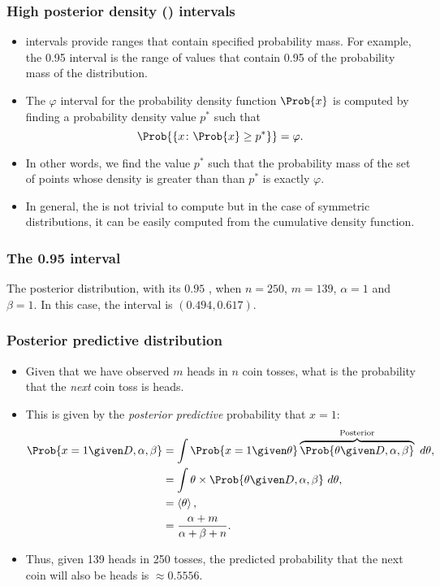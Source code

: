 \documentclass{slides}
\begin{document}
\begin{frame}
	\frametitle{High posterior density (\hpd) intervals}
	\begin{itemize}
		\item \hpd intervals provide ranges that contain specified probability mass. For example, the 0.95 \hpd interval is the range of values that contain 0.95 of the probability mass of the distribution.
		\item The $\varphi$ \hpd interval for the probability density function $\Prob{x}$ is computed by finding a probability density value $p^*$ such that 
		\[
			\Prob{\{x \colon \Prob{x} \geq p^*\}} = \varphi.
		\]
		\item In other words, we find the value $p^*$ such that the probability mass of the set of points whose density is greater than than $p^*$ is exactly $\varphi$. 
		\item In general, the \hpd is not trivial to compute but in the case of symmetric distributions, it can be easily computed from the cumulative density function.
	\end{itemize}
\end{frame}

\begin{frame}
	\frametitle{The 0.95 \hpd interval}
	
	The posterior distribution, with its $0.95$ \hpd, when $n=250$, $m=139$, $\alpha=1$ and $\beta=1$. In this case, the \hpd interval is $(0.494, 0.617)$.
\end{frame}

\begin{frame}
	\frametitle{Posterior predictive distribution}

	\begin{itemize}
		\item Given that we have observed $m$ heads in $n$ coin tosses, what is the probability that the \emph{next} coin toss is heads.
		\item This is given by the \emph{posterior predictive} probability that $x=1$:
			\begin{align*}
				\Prob{x=1\given D, \alpha, \beta} &= \int \Prob{x=1 \given \theta} \overbrace{\Prob{\theta\given D, \alpha, \beta}}^{\text{Posterior}}\ d\theta,\\
				&= \int \theta \times \Prob{\theta\given D, \alpha, \beta} \ d\theta,\\
				&= \left\langle \theta \right\rangle,\\
				&= \frac{\alpha+m}{\alpha+\beta+n}.
			\end{align*}
		\item Thus, given 139 heads in 250 tosses, the predicted probability that the next coin will also be heads is $\approx 0.5556$.
	\end{itemize}
\end{frame}
	
\end{document}
